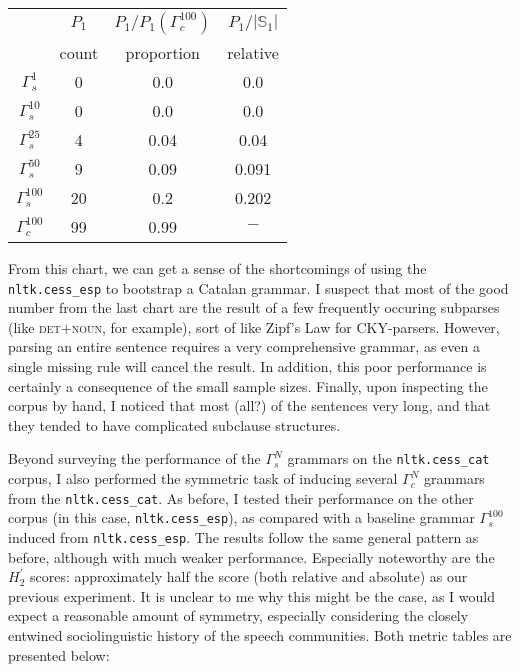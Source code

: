 \documentclass[paper=a4, fontsize=11pt]{scrartcl} %
\newcommand{\gcat}{\Gamma_{c}}
\newcommand{\gesp}{\Gamma_{s}}
\begin{document}
\begin{center}
    \begin{tabular}{||c||ccc||}
        \hline\hline
        & $P_1$ & $P_1/P_1(\gcat^{100})$ & $P_1/|\mathbb{S}_1|$ \\
        & count & proportion & relative \\
        \hline\hline
        $\gesp^{1}$ & 0 & 0.0 & 0.0 \\ %
        $\gesp^{10}$ & 0 & 0.0 & 0.0 \\ %
        $\gesp^{25}$ & 4 & 0.04 & 0.04 \\ %
        $\gesp^{50}$ & 9 & 0.09 & 0.091 \\ %
        $\gesp^{100}$ & 20 & 0.2 & 0.202 \\ %
        \hline
        $\gcat^{100}$ & 99 & 0.99 & $-$ \\ %
        \hline\hline
    \end{tabular}
\end{center}

From this chart, we can get a sense of the shortcomings of using the \texttt{nltk.cess\_esp} to bootstrap a Catalan grammar.  I suspect that most of the good number from the last chart are the result of a few frequently occuring subparses (like \textsc{det}$+$\textsc{noun}, for example), sort of like Zipf's Law for CKY-parsers.  However, parsing an entire sentence requires a very comprehensive grammar, as even a single missing rule will cancel the result.  In addition, this poor performance is certainly a consequence of the small sample sizes.  Finally, upon inspecting the corpus by hand, I noticed that most (all?) of the sentences very long, and that they tended to have complicated subclause structures.

Beyond surveying the performance of the $\gesp^N$ grammars on the \texttt{nltk.cess\_cat} corpus, I also performed the symmetric task of inducing several $\gcat^N$ grammars from the \texttt{nltk.cess\_cat}.  As before, I tested their performance on the other corpus (in this case, \texttt{nltk.cess\_esp}), as compared with a baseline grammar $\gesp^{100}$ induced from \texttt{nltk.cess\_esp}.  The results follow the same general pattern as before, although with much weaker performance.  Especially noteworthy are the $H_2^\prime$ scores: approximately half the score (both relative and absolute) as our previous experiment.  It is unclear to me why this might be the case, as I would expect a reasonable amount of symmetry, especially considering the closely entwined sociolinguistic history of the speech communities.  Both metric tables are presented below:
\end{document}
